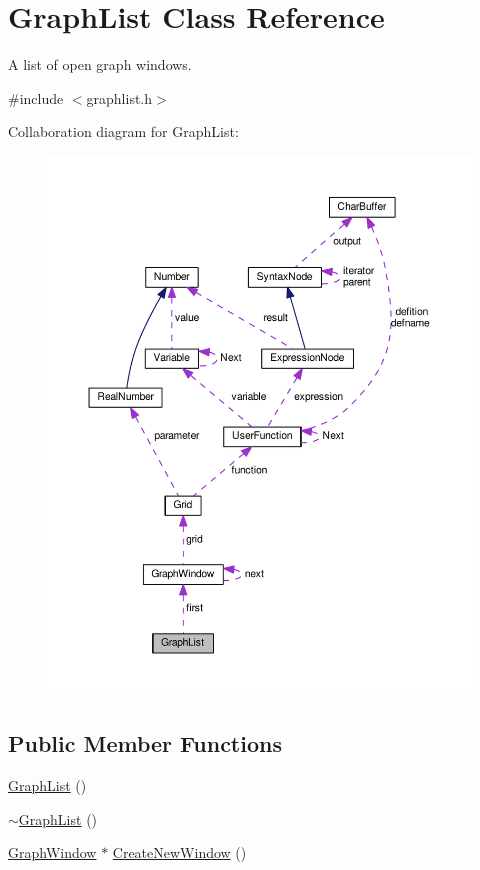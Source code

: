 \hypertarget{classGraphList}{}\section{Graph\+List Class Reference}
\label{classGraphList}


A list of open graph windows.  




{\ttfamily \#include $<$graphlist.\+h$>$}



Collaboration diagram for Graph\+List\+:\nopagebreak
\begin{figure}[H]
\begin{center}
\leavevmode
\includegraphics[width=350pt]{classGraphList__coll__graph}
\end{center}
\end{figure}
\subsection*{Public Member Functions}
\begin{DoxyCompactItemize}
\item 
\hyperlink{classGraphList_a7a5c8bcb31e753f7b32cbd7da34db063}{Graph\+List} ()
\item 
\hyperlink{classGraphList_a0cf2f539fc2594ae27f35d94deebc232}{$\sim$\+Graph\+List} ()
\item 
\hyperlink{classGraphWindow}{Graph\+Window} $\ast$ \hyperlink{classGraphList_a184e5ad986cd07281a96dc107ebfcd5d}{Create\+New\+Window} ()
\end{DoxyCompactItemize}
